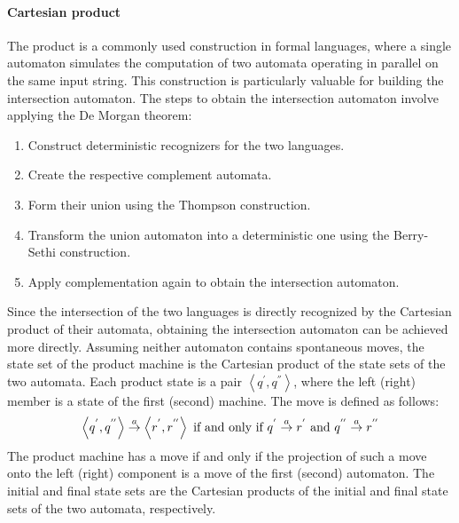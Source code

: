 \paragraph*{Cartesian product}
The product is a commonly used construction in formal languages, where a single automaton simulates the computation of two automata operating in parallel on the same input string. 
This construction is particularly valuable for building the intersection automaton. 
The steps to obtain the intersection automaton involve applying the De Morgan theorem:
\begin{enumerate}
    \item Construct deterministic recognizers for the two languages.
    \item Create the respective complement automata.
    \item Form their union using the Thompson construction.
    \item Transform the union automaton into a deterministic one using the Berry-Sethi construction.
    \item Apply complementation again to obtain the intersection automaton.
\end{enumerate}
Since the intersection of the two languages is directly recognized by the Cartesian product of their automata, obtaining the intersection automaton can be achieved more directly.
Assuming neither automaton contains spontaneous moves, the state set of the product machine is the Cartesian product of the state sets of the two automata. 
Each product state is a pair $\left\langle q^{'},q^{''} \right\rangle $, where the left (right) member is a state of the first (second) machine.
The move is defined as follows:
\[\left\langle q^{'},q^{''} \right\rangle \overset{a}{\rightarrow} \left\langle r^{'},r^{''} \right\rangle \textnormal{ if and only if } q^{'} \overset{a}{\rightarrow} r^{'} \textnormal{ and } q^{''} \overset{a}{\rightarrow} r^{''}\]
The product machine has a move if and only if the projection of such a move onto the left (right) component is a move of the first (second) automaton. 
The initial and final state sets are the Cartesian products of the initial and final state sets of the two automata, respectively.
